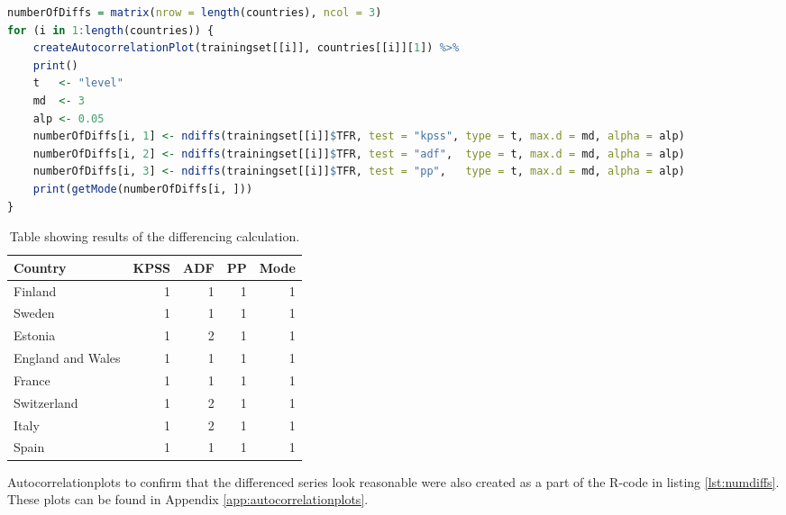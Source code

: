 \documentclass[a4paper, 12pt]{scrartcl}
\begin{document}
\begin{lstlisting}[language=R, caption={R-code for computing all suggested differences.}, label={lst:numdiffs}]
numberOfDiffs = matrix(nrow = length(countries), ncol = 3)
for (i in 1:length(countries)) {
	createAutocorrelationPlot(trainingset[[i]], countries[[i]][1]) %>%
	print()
	t   <- "level"
	md  <- 3
	alp <- 0.05
	numberOfDiffs[i, 1] <- ndiffs(trainingset[[i]]$TFR, test = "kpss", type = t, max.d = md, alpha = alp)
	numberOfDiffs[i, 2] <- ndiffs(trainingset[[i]]$TFR, test = "adf",  type = t, max.d = md, alpha = alp)
	numberOfDiffs[i, 3] <- ndiffs(trainingset[[i]]$TFR, test = "pp",   type = t, max.d = md, alpha = alp)
	print(getMode(numberOfDiffs[i, ]))
}
\end{lstlisting}
\begin{table}[b]
	\centering
	\begin{tabular}{l | r r r r}
		Country & \multicolumn{1}{l}{KPSS} & \multicolumn{1}{l}{ADF} & \multicolumn{1}{l}{PP} & \multicolumn{1}{l}{Mode}\\
		\hline
		Finland		& 1 & 1 & 1 & 1\\
		Sweden 		& 1 & 1 & 1 & 1\\
		Estonia		& 1 & 2 & 1 & 1\\
		England and Wales & 1 & 1 & 1 & 1\\
		France		& 1 & 1 & 1 & 1\\
		Switzerland & 1 & 2 & 1 & 1\\
		Italy		& 1 & 2 & 1 & 1\\
		Spain		& 1 & 1 & 1 & 1
	\end{tabular}
	\caption{Table showing results of the differencing calculation.\label{tbl:numdiffs}}
\end{table}

Autocorrelationplots to confirm that the differenced series look reasonable were also created as a part of the R-code in listing \ref{lst:numdiffs}.
These plots can be found in Appendix \ref{app:autocorrelationplots}.
\end{document}
